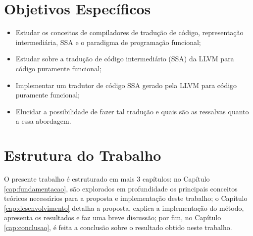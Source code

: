 \section{Objetivos Específicos}

\begin{itemize}
    \item Estudar os conceitos de compiladores de tradução de código, representação intermediária, SSA e o paradigma de programação funcional;
    \item Estudar sobre a tradução de código intermediário (SSA) da LLVM para código puramente funcional;
    \item Implementar um tradutor de código SSA gerado pela LLVM para código puramente funcional;
    \item Elucidar a possibilidade de fazer tal tradução e quais são as ressalvas quanto a essa abordagem.
\end{itemize}

\section{Estrutura do Trabalho}

O presente trabalho é estruturado em mais 3 capítulos: no Capítulo \ref{cap:fundamentacao}, são explorados em profundidade os principais conceitos teóricos necessários para a proposta e implementação deste trabalho; o Capítulo \ref{cap:desenvolvimento} detalha a proposta, explica a implementação do método, apresenta os resultados e faz uma breve discussão; por fim, no Capítulo \ref{cap:conclusao}, é feita a conclusão sobre o resultado obtido neste trabalho.

